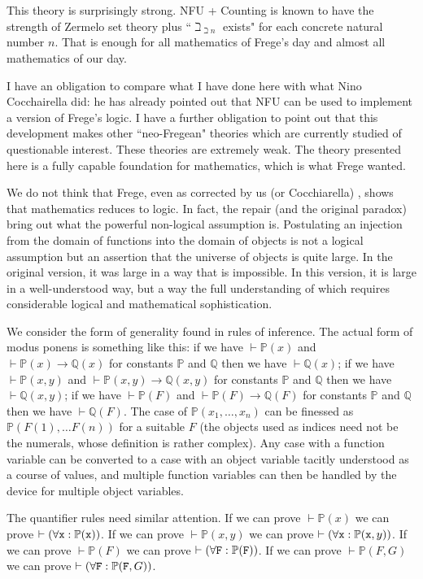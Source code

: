 \documentclass[12pt]{article}
\begin{document}
This theory is surprisingly strong.  NFU + Counting is known to have the strength of Zermelo set theory plus ``$\beth_{\beth n}$ exists" for each concrete natural number $n$.  That is enough for all mathematics of Frege's day and almost all mathematics of our day.

I have an obligation to compare what I have done here with what Nino Cocchairella did:  he has already pointed out that NFU can be used to implement a version of Frege's logic.  I have a further obligation to point out that this development makes other ``neo-Fregean" theories which are currently studied of questionable interest.  These theories are extremely weak.  The theory presented here is a fully capable foundation for mathematics, which is what Frege wanted.

We do not think that Frege, even as corrected by us (or Cocchiarella) , shows that mathematics reduces to logic.  In fact, the repair (and the original paradox) bring out what the powerful non-logical assumption is.  Postulating an injection from the domain of  functions into the domain of objects  is not a logical assumption but an assertion that the universe of objects is quite large.  In the original version, it was large in a way that is impossible.  In this version, it is large in a well-understood way, but a way the full understanding of which requires considerable logical and mathematical sophistication.

We consider the form of generality found in rules of inference.  The actual form of modus ponens is something like this:  if we have $\vdash {\mathbb P}(x)$ and $\vdash {\mathbb P}(x)\rightarrow {\mathbb Q}(x)$
 for constants $\mathbb P$ and $\mathbb Q$ then we have $\vdash {\mathbb Q}(x)$;    if we have $\vdash {\mathbb P}(x,y)$ and $\vdash {\mathbb P}(x,y)\rightarrow {\mathbb Q}(x,y)$
 for constants $\mathbb P$ and $\mathbb Q$ then we have $\vdash {\mathbb Q}(x,y)$;  if we have $\vdash {\mathbb P}(F)$ and $\vdash {\mathbb P}(F)\rightarrow {\mathbb Q}(F)$
 for constants $\mathbb P$ and $\mathbb Q$ then we have $\vdash {\mathbb Q}(F)$.  The case of ${\mathbb P}(x_1,\ldots,x_n)$ can be finessed as ${\mathbb P}(F(1),\ldots F(n))$ for a suitable $F$ (the objects used as indices need not be the numerals, whose definition is rather complex).  Any case with a function variable can be converted to a case with an object variable tacitly understood as a course of values, and
multiple function variables can then be handled by the device for multiple object variables.

The quantifier rules need similar attention.  If we can prove $\vdash {\mathbb P}(x)$ we can prove $\vdash (\forall {\tt x}:{\mathbb P}({\tt x}))$.  If we can prove $\vdash {\mathbb P}(x,y)$ we can prove $\vdash (\forall {\tt x}:{\mathbb P}({\tt x},y))$. If we can prove $\vdash {\mathbb P}(F)$ we can prove $\vdash (\forall {\tt F}:{\mathbb P}({\tt F}))$.  If we can prove $\vdash {\mathbb P}(F,G)$ we can prove $\vdash(\forall {\tt F}:{\mathbb P}({\tt F},G))$.
\end{document}
